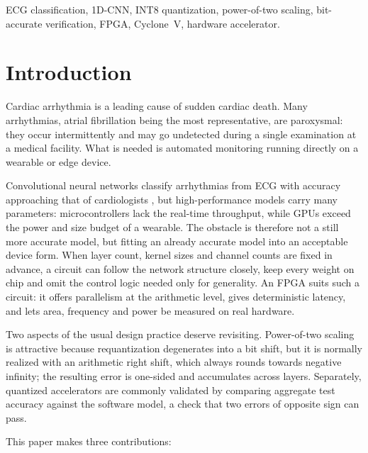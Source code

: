 \documentclass[conference,10pt]{IEEEtran}
\begin{document}
\begin{IEEEkeywords}
ECG classification, 1D-CNN, INT8 quantization, power-of-two scaling, bit-accurate
verification, FPGA, Cyclone~V, hardware accelerator.
\end{IEEEkeywords}

\section{Introduction}

Cardiac arrhythmia is a leading cause of sudden cardiac death. Many arrhythmias,
atrial fibrillation being the most representative, are paroxysmal: they occur
intermittently and may go undetected during a single examination at a medical
facility. What is needed is automated monitoring running directly on a wearable
or edge device.

Convolutional neural networks classify arrhythmias from ECG with accuracy
approaching that of cardiologists \cite{hannun2019}, but high-performance models
carry many parameters: microcontrollers lack the real-time throughput, while GPUs
exceed the power and size budget of a wearable. The obstacle is therefore not a
still more accurate model, but fitting an already accurate model into an
acceptable device form. When layer count, kernel sizes and channel counts are
fixed in advance, a circuit can follow the network structure closely, keep every
weight on chip and omit the control logic needed only for generality. An FPGA
suits such a circuit: it offers parallelism at the arithmetic level, gives
deterministic latency, and lets area, frequency and power be measured on real
hardware.

Two aspects of the usual design practice deserve revisiting. Power-of-two scaling
is attractive because requantization degenerates into a bit shift, but it is
normally realized with an arithmetic right shift, which always rounds towards
negative infinity; the resulting error is one-sided and accumulates across
layers. Separately, quantized accelerators are commonly validated by comparing
aggregate test accuracy against the software model, a check that two errors of
opposite sign can pass.

This paper makes three contributions:
\end{document}

